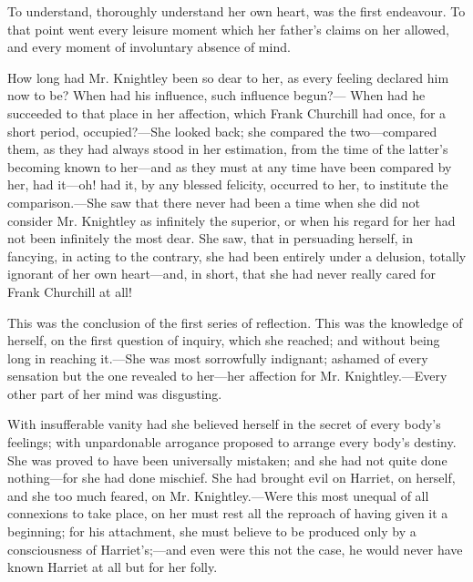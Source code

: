 To understand, thoroughly understand her own heart, was the first endeavour. To that point went every leisure moment which her father's claims on her allowed, and every moment of involuntary absence of mind.

How long had Mr. Knightley been so dear to her, as every feeling declared him now to be? When had his influence, such influence begun?--- When had he succeeded to that place in her affection, which Frank Churchill had once, for a short period, occupied?---She looked back; she compared the two---compared them, as they had always stood in her estimation, from the time of the latter's becoming known to her---and as they must at any time have been compared by her, had it---oh! had it, by any blessed felicity, occurred to her, to institute the comparison.---She saw that there never had been a time when she did not consider Mr. Knightley as infinitely the superior, or when his regard for her had not been infinitely the most dear. She saw, that in persuading herself, in fancying, in acting to the contrary, she had been entirely under a delusion, totally ignorant of her own heart---and, in short, that she had never really cared for Frank Churchill at all!

This was the conclusion of the first series of reflection. This was the knowledge of herself, on the first question of inquiry, which she reached; and without being long in reaching it.---She was most sorrowfully indignant; ashamed of every sensation but the one revealed to her---her affection for Mr. Knightley.---Every other part of her mind was disgusting.

With insufferable vanity had she believed herself in the secret of every body's feelings; with unpardonable arrogance proposed to arrange every body's destiny. She was proved to have been universally mistaken; and she had not quite done nothing---for she had done mischief. She had brought evil on Harriet, on herself, and she too much feared, on Mr. Knightley.---Were this most unequal of all connexions to take place, on her must rest all the reproach of having given it a beginning; for his attachment, she must believe to be produced only by a consciousness of Harriet's;---and even were this not the case, he would never have known Harriet at all but for her folly.

